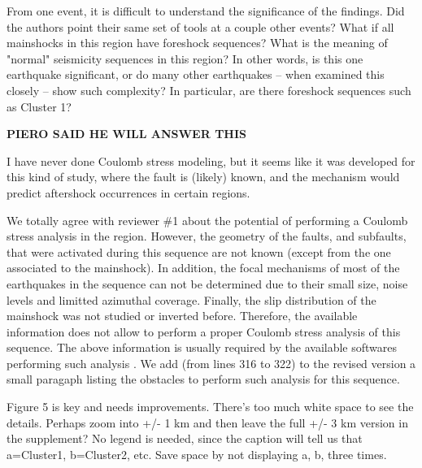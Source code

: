 \documentclass[10pt]{extarticle}
\begin{document}
%
%



\begin{ReviewerComment}{1}
\noindent 
From one event, it is difficult to understand the significance of the findings. Did the authors point their same set of tools at a couple other events? What if all mainshocks in this region have foreshock sequences? What is the meaning of "normal" seismicity sequences in this region? In other words, is this one earthquake significant, or do many other earthquakes -- when examined this closely -- show such complexity? In particular, are there foreshock sequences such as Cluster 1?

\end{ReviewerComment}


\begin{Answer}
\hfill {\bf PIERO SAID HE WILL ANSWER THIS}
 \WorkInProgressRevTask
\end{Answer}
%
%



\begin{ReviewerComment}{1}
\noindent 
I have never done Coulomb stress modeling, but it seems like it was developed for this kind of study, where the fault is (likely) known, and the mechanism would predict aftershock occurrences in certain regions.
\end{ReviewerComment}


\begin{Answer}
We totally agree with reviewer \#1 about the potential of performing a Coulomb stress analysis in the region. However, the geometry of the faults, and subfaults, that were activated during this sequence are not known (except from the one associated to the mainshock). In addition, the focal mechanisms of most of the earthquakes in the sequence can not be determined due to their small size, noise levels and limitted azimuthal coverage. Finally, the slip distribution of the mainshock was not studied or inverted before. Therefore, the available information does not allow to perform a proper Coulomb stress analysis of this sequence. The above information is usually required by the available softwares performing such analysis \citep{toda2011coulomb}. We add (from lines 316 to 322) to the revised version a small paragaph listing the obstacles to perform such analysis for this sequence.
 \WorkInProgressRevTask
\end{Answer}
%
%



\begin{ReviewerComment}{1}
\noindent 
Figure 5 is key and needs improvements. There's too much white space to see the details.  Perhaps zoom into +/- 1 km and then leave the full +/- 3 km version in the supplement? No legend is needed, since the caption will tell us that a=Cluster1, b=Cluster2, etc. Save space by not displaying a, b, three times.
\end{ReviewerComment}
\end{document}
